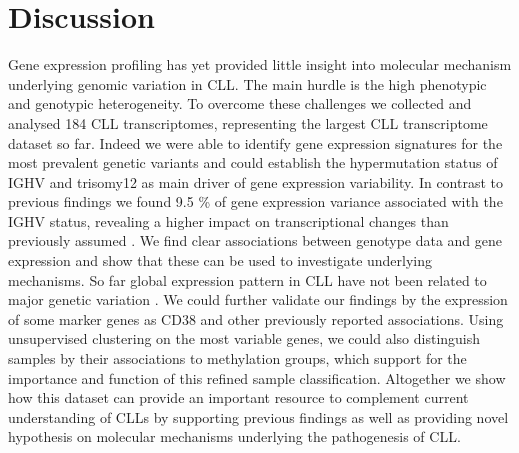 

\section{Discussion}

Gene expression profiling has yet provided little insight into molecular mechanism underlying genomic variation in CLL. The main hurdle is the high phenotypic and genotypic heterogeneity. To overcome these challenges we collected and analysed 184 CLL transcriptomes, representing the largest CLL transcriptome dataset so far. Indeed we were able to identify gene expression signatures for the most prevalent genetic variants and could establish the hypermutation status of IGHV and trisomy12 as main driver of gene expression variability. In contrast to previous findings we found 9.5 \% of gene expression variance associated with the IGHV status, revealing a higher impact on transcriptional changes than previously assumed \citep{Ferreira2014a}. We find clear associations between genotype data and gene expression and show that these can be used to investigate underlying mechanisms. So far global expression pattern in CLL have not been related to major genetic variation \citep{Ferreira2014a}. We could further validate our findings by the expression of some marker genes as CD38 and other previously reported associations. Using unsupervised clustering on the most variable genes, we could also distinguish samples by their associations to methylation groups, which support for the importance and function of this refined sample classification.  Altogether we show how this dataset can provide an important resource to complement current understanding of CLLs by supporting previous findings as well as providing novel hypothesis on molecular mechanisms underlying the pathogenesis of CLL.\\
\\
